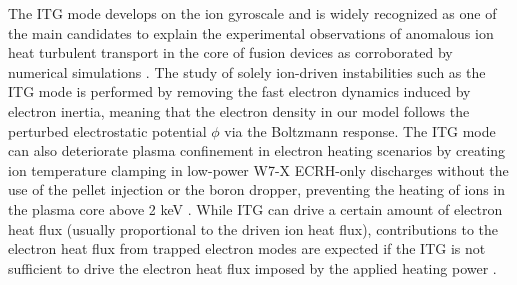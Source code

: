 \documentclass[prl,twocolumn,amsmath,amssymb,showpacs,superscriptaddress]{revtex4-2}
\begin{document}
The ITG mode develops on the ion gyroscale and is widely recognized as one of the main candidates to explain the experimental observations of anomalous ion heat turbulent transport in the core of fusion devices \cite{Garbet2004} as corroborated by numerical simulations \cite{Hahm1998,Romanelli1998,Plunk2014}.
%
The study of solely ion-driven instabilities such as the ITG mode is performed by removing the fast electron dynamics induced by electron inertia, meaning that the electron density in our model follows the perturbed electrostatic potential $\phi$ via the Boltzmann response.
%
The ITG mode can also deteriorate plasma confinement in electron heating scenarios by creating ion temperature clamping {in low-power W7-X ECRH-only discharges without the use of the pellet injection or the boron dropper}, preventing the heating of ions in the plasma core above 2 keV \cite{Beurskens2021}.
%
While ITG can drive a certain amount of electron heat flux (usually proportional to the driven ion heat flux), contributions to the electron heat flux from trapped electron modes are expected if the ITG is not sufficient to drive the electron heat flux imposed by the applied heating power \cite{Ryter2019}.
%
%
\end{document}
